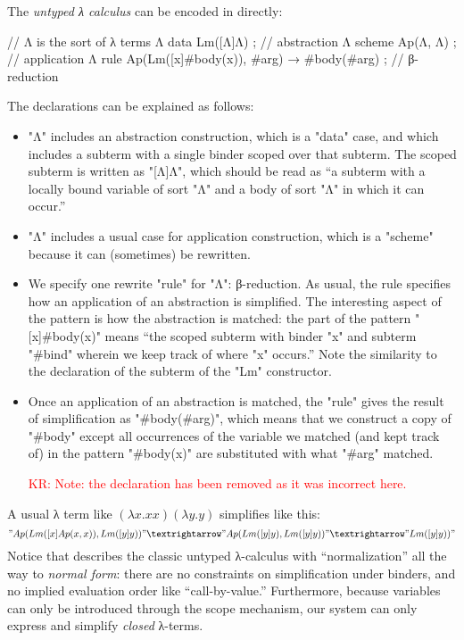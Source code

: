 \documentclass[letterpaper,11pt]{article}
\newcommand{\KR}[1]{\textcolor{red}{KR: #1}}
\begin{document}
\begin{example}\label{ex:lambda}
  The \emph{untyped λ calculus} can be encoded in \hax directly:
  \begin{hacs}[numbers=right,texcl]
    // Λ is the sort of λ terms
    Λ  data Lm([Λ]Λ) ;                                        // abstraction
    Λ  scheme Ap(Λ, Λ) ;                                      // application
    Λ  rule Ap(Lm([x]#body(x)), #arg) →  #body(#arg) ;    // β-reduction
  \end{hacs}
  The declarations can be explained as follows:
  \begin{itemize}

  \item "Λ" includes an abstraction construction, which is a "data" case, and which includes a
    subterm with a single binder scoped over that subterm. The scoped subterm is written as
    "[Λ]Λ", which should be read as ``a subterm with a locally bound variable of sort "Λ" and a
    body of sort "Λ" in which it can occur.''

  \item "Λ" includes a usual case for application construction, which is a "scheme" because it
    can (sometimes) be rewritten.

  \item We specify one rewrite "rule" for "Λ": β-reduction. As usual, the rule specifies how an
    application of an abstraction is simplified. The interesting aspect of the pattern is how the
    abstraction is matched: the part of the pattern "[x]#body(x)" means ``the scoped subterm with
    binder "x" and subterm "#bind" wherein we keep track of where "x" occurs.'' Note the similarity
    to the declaration of the subterm of the "Lm" constructor.

  \item Once an application of an abstraction is matched, the "rule" gives the result of
    simplification as "#body(#arg)", which means that we construct a copy of "#body" except all
    occurrences of the variable we matched (and kept track of) in the pattern "#body(x)" are
    substituted with what "#arg" matched.

    \KR{Note: the  declaration has been removed as it was incorrect here.}

  \end{itemize}
  A usual λ term like $(λx.x x)(λy.y)$ simplifies like this:
  \begin{displaymath}
    "Ap(Lm([x]Ap(x, x)), Lm([y]y))" →
    "Ap(Lm([y]y), Lm([y]y))" →
    "Lm([y]y))"
  \end{displaymath}
  Notice that \hax describes the classic untyped λ-calculus with ``normalization'' all the way to
  \emph{normal form}: there are no constraints on simplification under binders, and no implied
  evaluation order like ``call-by-value.'' Furthermore, because variables can only be introduced
  through the scope mechanism, our system can only express and simplify \emph{closed} λ-terms.
\end{example}
\end{document}
